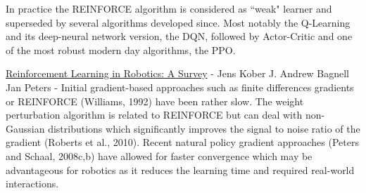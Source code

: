 \documentclass[]{article}
\begin{document}
In practice the REINFORCE algorithm is considered as ``weak" learner and superseded by several algorithms developed since. Most notably the Q-Learning and its deep-neural network version, the DQN, followed by Actor-Critic and one of the most robust modern day algorithms, the PPO. 

\href{https://www.ri.cmu.edu/pub_files/2013/7/Kober_IJRR_2013.pdf}{Reinforcement Learning in Robotics: A Survey}  - Jens Kober J. Andrew Bagnell Jan Peters -   
Initial gradient-based approaches such as finite differences gradients or REINFORCE
(Williams, 1992) have been rather slow. The weight perturbation algorithm is related to
REINFORCE but can deal with non-Gaussian distributions which significantly improves
the signal to noise ratio of the gradient (Roberts et al., 2010). Recent natural policy
gradient approaches (Peters and Schaal, 2008c,b) have allowed for faster convergence
which may be advantageous for robotics as it reduces the learning time and required
real-world interactions.
\end{document}
